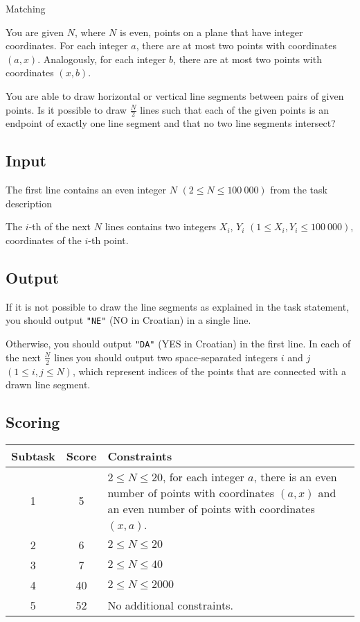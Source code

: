 \begin{statement}[
  problempoints=110,
  timelimit=? seconds,
  memorylimit=512 MiB,
]{Matching}

You are given $N$, where $N$ is even, points on a plane that have integer
coordinates. For each integer $a$, there are at most two points with coordinates
$(a, x)$. Analogously, for each integer $b$, there are at most two points
with coordinates $(x, b)$.

You are able to draw horizontal or vertical line segments between pairs of given
points. Is it possible to draw $\frac{N}{2}$ lines such that each of the
given points is an endpoint of exactly one line segment and that no two line
segments intersect?

\subsection*{Input}
The first line contains an even integer $N$ $(2 \le N \le 100\ 000)$ from
the task description

The $i$-th of the next $N$ lines contains two integers $X_i$, $Y_i$
$(1 \le X_i, Y_i \le 100\ 000)$, coordinates of the $i$-th point.

\subsection*{Output}
If it is not possible to draw the line segments as explained in the task
statement, you should output \texttt{"NE"} (NO in Croatian) in a single line.

Otherwise, you should output \texttt{"DA"} (YES in Croatian) in the first
line. In each of the next $\frac{N}{2}$ lines you should output two
space-separated integers $i$ and $j$ $(1 \le i, j \le N)$, which represent
indices of the points that are connected with a drawn line segment.

 \subsection*{Scoring}
{\renewcommand{\arraystretch}{1.4}
  \setlength{\tabcolsep}{6pt}
  \begin{tabular}{ccl}
 Subtask & Score & Constraints \\ \midrule
    1 & 5 &   \makecell[l]{$2 \le N \le 20$, for each integer $a$, there is an even
              number of points with coordinates $(a, x)$ \\ and an even number
              of points with coordinates
              $(x, a)$. } \\
  2 & 6 & $2 \le N \le 20$ \\
  3 & 7 & $2 \le N \le 40$ \\
  4 & 40 & $2 \le N \le 2000$ \\
  5 & 52 & No additional constraints.
\end{tabular}}


\end{statement}
